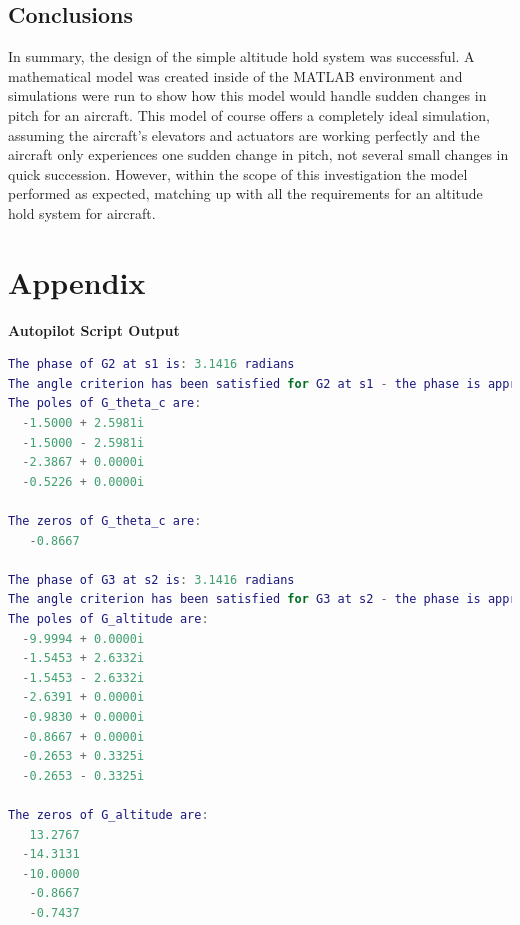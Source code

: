 \documentclass[stu, a4paper, 12pt, floatsintext]{apa7}
\numberwithin{figure}{section}
\numberwithin{table}{section}
\numberwithin{equation}{section}
\begin{document}
\subsection{Conclusions} 
In summary, the design of the simple altitude hold system was successful. A mathematical model was created inside of the MATLAB environment and simulations were run to show how this model would handle sudden changes in pitch for an aircraft. This model of course offers a completely ideal simulation, assuming the aircraft's elevators and actuators are working perfectly and the aircraft only experiences one sudden change in pitch, not several small changes in quick succession. However, within the scope of this investigation the model performed as expected, matching up with all the requirements for an altitude hold system for aircraft.  
\newpage
\section{Appendix}
\listoffigures
{}
\listoftables
{}
\listofmyequations

\textbf{Autopilot Script Output}
\begin{lstlisting}[language=MATLAB]
The phase of G2 at s1 is: 3.1416 radians
The angle criterion has been satisfied for G2 at s1 - the phase is approximately pi.
The poles of G_theta_c are:
  -1.5000 + 2.5981i
  -1.5000 - 2.5981i
  -2.3867 + 0.0000i
  -0.5226 + 0.0000i

The zeros of G_theta_c are:
   -0.8667

The phase of G3 at s2 is: 3.1416 radians
The angle criterion has been satisfied for G3 at s2 - the phase is approximately pi.
The poles of G_altitude are:
  -9.9994 + 0.0000i
  -1.5453 + 2.6332i
  -1.5453 - 2.6332i
  -2.6391 + 0.0000i
  -0.9830 + 0.0000i
  -0.8667 + 0.0000i
  -0.2653 + 0.3325i
  -0.2653 - 0.3325i

The zeros of G_altitude are:
   13.2767
  -14.3131
  -10.0000
   -0.8667
   -0.7437
\end{lstlisting}

\newpage
{}
\printbibliography
\end{document}
